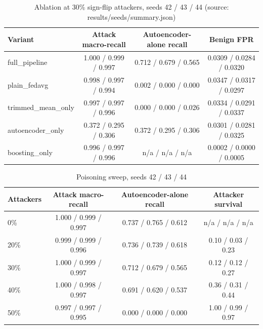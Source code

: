 \begin{table}[H]
\centering
\small
\setlength{\tabcolsep}{3pt}
\renewcommand{\arraystretch}{1.15}
\begin{tabular}{|l|c|c|c|}
\hline
\textbf{Variant} & \textbf{Attack macro-recall} & \textbf{Autoencoder-alone recall} & \textbf{Benign FPR} \\ \hline
full\_pipeline & 1.000 / 0.999 / 0.997 & 0.712 / 0.679 / 0.565 & 0.0309 / 0.0284 / 0.0320 \\ \hline
plain\_fedavg & 0.998 / 0.997 / 0.994 & 0.002 / 0.000 / 0.000 & 0.0347 / 0.0317 / 0.0297 \\ \hline
trimmed\_mean\_only & 0.997 / 0.997 / 0.996 & 0.000 / 0.000 / 0.026 & 0.0334 / 0.0291 / 0.0337 \\ \hline
autoencoder\_only & 0.372 / 0.295 / 0.306 & 0.372 / 0.295 / 0.306 & 0.0301 / 0.0281 / 0.0325 \\ \hline
boosting\_only & 0.996 / 0.997 / 0.996 & n/a / n/a / n/a & 0.0002 / 0.0000 / 0.0005 \\ \hline
\end{tabular}
\caption{Ablation at 30\% sign-flip attackers, seeds 42 / 43 / 44 (source: results/seeds/summary.json)}
\label{tab:fu_seed_ablation}
\end{table}
\begin{table}[H]
\centering
\small
\setlength{\tabcolsep}{3pt}
\renewcommand{\arraystretch}{1.15}
\begin{tabular}{|l|c|c|c|}
\hline
\textbf{Attackers} & \textbf{Attack macro-recall} & \textbf{Autoencoder-alone recall} & \textbf{Attacker survival} \\ \hline
0\% & 1.000 / 0.999 / 0.997 & 0.737 / 0.765 / 0.612 & n/a / n/a / n/a \\ \hline
20\% & 0.999 / 0.999 / 0.996 & 0.736 / 0.739 / 0.618 & 0.10 / 0.03 / 0.23 \\ \hline
30\% & 1.000 / 0.999 / 0.997 & 0.712 / 0.679 / 0.565 & 0.12 / 0.12 / 0.27 \\ \hline
40\% & 1.000 / 0.998 / 0.997 & 0.691 / 0.620 / 0.537 & 0.36 / 0.31 / 0.44 \\ \hline
50\% & 0.997 / 0.997 / 0.995 & 0.000 / 0.000 / 0.000 & 1.00 / 0.99 / 0.97 \\ \hline
\end{tabular}
\caption{Poisoning sweep, seeds 42 / 43 / 44}
\label{tab:fu_seed_sweep}
\end{table}
